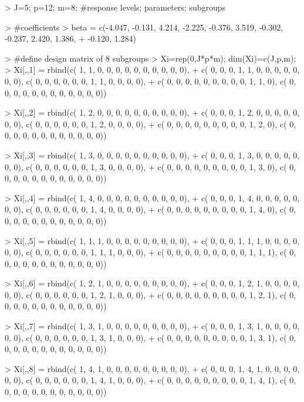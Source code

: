 \begin{example}
  > J=5; p=12; m=8; #response levels; parameters; subgroups

  > #coefficients
  > beta = c(-4.047, -0.131, 4.214, -2.225, -0.376, 3.519, -0.302, -0.237,  2.420, 1.386,
  + -0.120,  1.284)

  > #define design matrix of 8 subgroups
  > Xi=rep(0,J*p*m); dim(Xi)=c(J,p,m);
  > Xi[,,1] = rbind(c( 1, 1, 0, 0, 0, 0, 0, 0, 0, 0, 0, 0),
    +   c( 0, 0, 0, 1, 1, 0, 0, 0, 0, 0, 0, 0), c( 0, 0, 0, 0, 0, 0, 1, 1, 0, 0, 0, 0),
  +   c( 0, 0, 0, 0, 0, 0, 0, 0, 0, 1, 1, 0), c( 0, 0, 0, 0, 0, 0, 0, 0, 0, 0, 0, 0))

  > Xi[,,2] = rbind(c( 1, 2, 0, 0, 0, 0, 0, 0, 0, 0, 0, 0),
    +   c( 0, 0, 0, 1, 2, 0, 0, 0, 0, 0, 0, 0), c( 0, 0, 0, 0, 0, 0, 1, 2, 0, 0, 0, 0),
  +   c( 0, 0, 0, 0, 0, 0, 0, 0, 0, 1, 2, 0), c( 0, 0, 0, 0, 0, 0, 0, 0, 0, 0, 0, 0))

  > Xi[,,3] = rbind(c( 1, 3, 0, 0, 0, 0, 0, 0, 0, 0, 0, 0),
    +   c( 0, 0, 0, 1, 3, 0, 0, 0, 0, 0, 0, 0), c( 0, 0, 0, 0, 0, 0, 1, 3, 0, 0, 0, 0),
  +   c( 0, 0, 0, 0, 0, 0, 0, 0, 0, 1, 3, 0), c( 0, 0, 0, 0, 0, 0, 0, 0, 0, 0, 0, 0))

  > Xi[,,4] = rbind(c( 1, 4, 0, 0, 0, 0, 0, 0, 0, 0, 0, 0),
    +   c( 0, 0, 0, 1, 4, 0, 0, 0, 0, 0, 0, 0), c( 0, 0, 0, 0, 0, 0, 1, 4, 0, 0, 0, 0),
  +   c( 0, 0, 0, 0, 0, 0, 0, 0, 0, 1, 4, 0), c( 0, 0, 0, 0, 0, 0, 0, 0, 0, 0, 0, 0))

  > Xi[,,5] = rbind(c( 1, 1, 1, 0, 0, 0, 0, 0, 0, 0, 0, 0),
    +   c( 0, 0, 0, 1, 1, 1, 0, 0, 0, 0, 0, 0), c( 0, 0, 0, 0, 0, 0, 1, 1, 1, 0, 0, 0),
  +   c( 0, 0, 0, 0, 0, 0, 0, 0, 0, 1, 1, 1), c( 0, 0, 0, 0, 0, 0, 0, 0, 0, 0, 0, 0))

  > Xi[,,6] = rbind(c( 1, 2, 1, 0, 0, 0, 0, 0, 0, 0, 0, 0),
    +   c( 0, 0, 0, 1, 2, 1, 0, 0, 0, 0, 0, 0), c( 0, 0, 0, 0, 0, 0, 1, 2, 1, 0, 0, 0),
  +   c( 0, 0, 0, 0, 0, 0, 0, 0, 0, 1, 2, 1), c( 0, 0, 0, 0, 0, 0, 0, 0, 0, 0, 0, 0))

  > Xi[,,7] = rbind(c( 1, 3, 1, 0, 0, 0, 0, 0, 0, 0, 0, 0),
    +   c( 0, 0, 0, 1, 3, 1, 0, 0, 0, 0, 0, 0), c( 0, 0, 0, 0, 0, 0, 1, 3, 1, 0, 0, 0),
  +   c( 0, 0, 0, 0, 0, 0, 0, 0, 0, 1, 3, 1), c( 0, 0, 0, 0, 0, 0, 0, 0, 0, 0, 0, 0))

  > Xi[,,8] = rbind(c( 1, 4, 1, 0, 0, 0, 0, 0, 0, 0, 0, 0),
    +   c( 0, 0, 0, 1, 4, 1, 0, 0, 0, 0, 0, 0), c( 0, 0, 0, 0, 0, 0, 1, 4, 1, 0, 0, 0),
  +   c( 0, 0, 0, 0, 0, 0, 0, 0, 0, 1, 4, 1), c( 0, 0, 0, 0, 0, 0, 0, 0, 0, 0, 0, 0))
\end{example}

